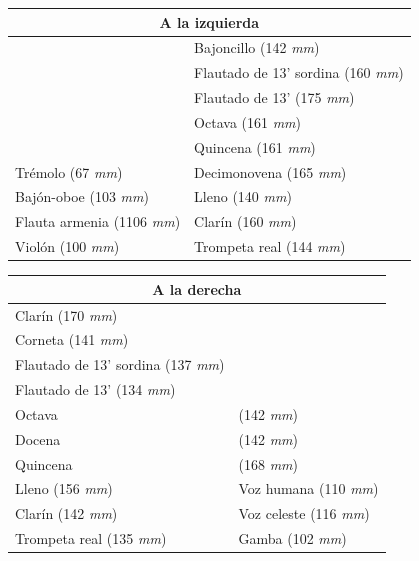 \begin{center}
	\begin{tabular}{|l|l|}
		\hline \multicolumn{2}{|c|}{\textbf{A la izquierda}} \\	
		\hline & Bajoncillo (142 \textit{mm}) \\ 
		\hline & Flautado de 13' sordina (160 \textit{mm}) \\ 
		\hline & Flautado de 13' (175 \textit{mm})\\ 
		\hline & Octava (161 \textit{mm}) \\ 
		\hline & Quincena (161 \textit{mm}) \\ 
		\hline Trémolo (67 \textit{mm}) & Decimonovena (165 \textit{mm}) \\ 
		\hline Bajón-oboe (103 \textit{mm}) & Lleno (140 \textit{mm})  \\ 
		\hline Flauta armenia (1106 \textit{mm}) & Clarín (160 \textit{mm}) \\ 
		\hline  Violón (100 \textit{mm}) & Trompeta real (144 \textit{mm})  \\ 
		\hline
	\end{tabular}
	\smallskip
\end{center}

\smallskip
	
\begin{center}
	\begin{tabular}{|l|l|}
		\hline \multicolumn{2}{|c|}{\textbf{A la derecha}} \\
		\hline Clarín (170 \textit{mm}) &  \\ 
		\hline Corneta (141 \textit{mm}) &  \\ 
		\hline Flautado de 13' sordina (137 \textit{mm}) &  \\ 
		\hline Flautado de 13' (134 \textit{mm}) &  \\ 
		\hline Octava & (142 \textit{mm}) \\ 
		\hline Docena & (142 \textit{mm}) \\ 
		\hline Quincena & (168 \textit{mm}) \\ 
		\hline Lleno (156 \textit{mm}) & Voz humana (110 \textit{mm}) \\ 
		\hline Clarín (142 \textit{mm}) & Voz celeste (116 \textit{mm}) \\ 
		\hline Trompeta real (135 \textit{mm}) & Gamba (102 \textit{mm}) \\ 
		\hline 
	\end{tabular}
	\smallskip
\end{center}

